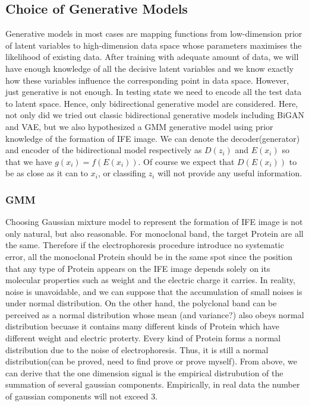 \documentclass[letterpaper]{article}
\begin{document}
\subsection{Choice of Generative Models}
Generative models in most cases are mapping functions from low-dimension prior of latent variables to high-dimension data space whose parameters maximises the likelihood of existing data\cite{goodfellow2016nips}. After training with adequate amount of data, we will have enough knowledge of all the decisive latent variables and we know exactly how these variables influence the corresponding point in data space. However, just generative is not enough. In testing state we need to encode all the test data to latent space. Hence, only bidirectional generative model are considered. Here, not only did we tried out classic bidirectional generative models including BiGAN and VAE, but we also hypothesized a GMM generative model using prior knowledge of the formation of IFE image. We can denote the decoder(generator) and encoder of the bidirectional model respectively as $D(z_i)$ and $E(x_i)$ so that we have $g(x_i)=f(E(x_i))$. Of course we expect that $D(E(x_i))$ to be as close as it can to $x_i$, or classifing $z_i$ will not provide any useful information.

\subsubsection{GMM}
Choosing Gaussian mixture model to represent the formation of IFE image is not only natural, but also reasonable. For monoclonal band, the target Protein are all the same. Therefore if the electrophoresis procedure introduce no systematic error, all the monoclonal Protein should be in the same spot since the position that any type of Protein appears on the IFE image depends solely on its molecular properties such as weight and the electric charge it carries. In reality, noise is unavoidable, and we can suppose that the accumulation of small noises is under normal distribution. On the other hand, the polyclonal band can be perceived as a normal distribution whose mean (and variance?) also obeys normal distribution becuase it contains many different kinds of Protein which have different weight and electric proterty. Every kind of Protein forms a normal distribution due to the noise of electrophoresis. Thus, it is still a normal distribution(can be proved, need to find prove or prove myself). From above, we can derive that the one dimension signal is the empirical distrubution of the summation of several gaussian components. Empirically, in real data the number of gaussian components will not exceed 3.
\end{document}
